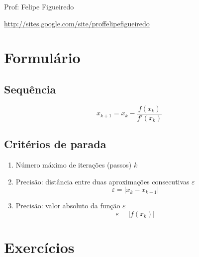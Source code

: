 \documentclass[a4paper]{article}
\begin{document}
\parbox[c]{.825\textwidth}{\raggedright%
{Prof: Felipe Figueiredo\par}
{\url{http://sites.google.com/site/proffelipefigueiredo}}

\vspace{1cm}
}


\section{Formulário}

\subsection*{Sequência}

\begin{displaymath}
  x_{k+1} = x_k - \frac{f(x_k)}{f'(x_k)}
\end{displaymath}

\subsection*{Critérios de parada}

\begin{enumerate}
\item Número máximo de iterações (passos) $k$

\item Precisão: distância entre duas aproximações consecutivas
  $\varepsilon$ 
  \begin{displaymath}
    \varepsilon = |x_k - x_{k-1}|
  \end{displaymath}

\item Precisão: valor absoluto da função $\varepsilon$
  \begin{displaymath}
    \varepsilon = |f(x_k)|
  \end{displaymath}

\end{enumerate}

\section{Exercícios}
\end{document}
